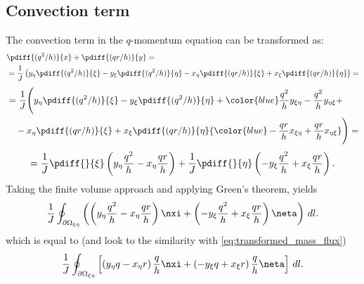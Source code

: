 \subsection{Convection term}
The convection term in the $q$-momentum equation can be transformed as:
%
\begin{align}
	&\pdiff{(q^2/h)}{x} + \pdiff{(qr/h)}{y} =
\\
	&= \frac{1}{J} \left(y_{\eta} \pdiff{(q^2/h)}{\xi} - y_{\xi} \pdiff{(q^2/h)}{\eta} -x_{\eta} \pdiff{(qr/h)}{\xi} + x_{\xi} \pdiff{(qr/h)}{\eta}\right) =
    \label{eq:xi_convection_term_1}
\end{align}
\begin{align}
	\begin{aligned}
		&= \frac{1}{J} \Bigg(y_{\eta} \pdiff{(q^2/h)}{\xi} - y_{\xi} \pdiff{(q^2/h)}{\eta} + {\color{blue}\frac{q^2}{h}  y_{\xi\eta} - \frac{q^2}{h} y_{\eta\xi}} +  \\
		&\quad -x_{\eta} \pdiff{(qr/h)}{\xi} + x_{\xi} \pdiff{(qr/h)}{\eta} {\color{blue} - \frac{qr}{h}  x_{\xi\eta} + \frac{qr}{h} x_{\eta\xi}} \Bigg) =
	\end{aligned}
\end{align}
\begin{align}
	= \frac{1}{J} \pdiff{}{\xi}\left(y_{\eta} \frac{q^2}{h} - x_{\eta} \frac{qr}{h} \right) + \frac{1}{J} \pdiff{}{\eta}\left(-y_{\xi} \frac{q^2}{h} + x_{\xi} \frac{qr}{h} \right).
    \label{eq:xi_convection_term}
\end{align}
%
Taking the finite volume approach and applying Green's theorem, yields
\begin{align}
    \frac{1}{J}\oint_{\partial\Omega_{\xi\eta}} \left( \left( y_{\eta}\frac{q^2}{h} - x_{\eta} \frac{qr}{h} \right) \nxi + \left(-y_{\xi} \frac{q^2}{h} + x_{\xi} \frac{qr}{h} \right) \neta \right)\, dl.
\end{align}
which is equal to (and look to the similarity with \autoref{eq:transformed_mass_flux})
\begin{align}
    \frac{1}{J}\oint_{\partial\Omega_{\xi\eta}} \left[  \left( y_{\eta}q - x_{\eta} r \right) \frac{q}{h}  \nxi + \left( -y_{\xi}q  + x_{\xi}r\right) \frac{q}{h} \neta \right] \, dl.\label{eq:transformed_convection_x}
\end{align}

